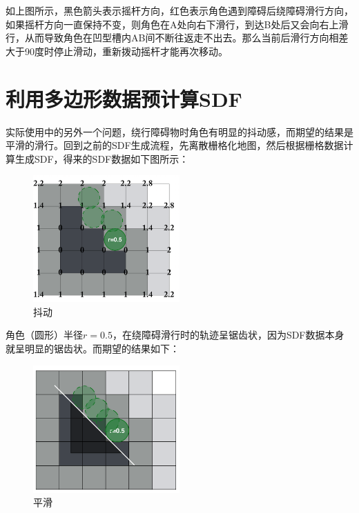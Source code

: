 如上图所示，黑色箭头表示摇杆方向，红色表示角色遇到障碍后绕障碍滑行方向，如果摇杆方向一直保持不变，则角色在A处向右下滑行，到达B处后又会向右上滑行，从而导致角色在凹型槽内AB间不断往返走不出去。那么当前后滑行方向相差大于90度时停止滑动，重新拨动摇杆才能再次移动。

\hypertarget{ux5229ux7528ux591aux8fb9ux5f62ux6570ux636eux9884ux8ba1ux7b97sdf}{%
\section{利用多边形数据预计算SDF}\label{ux5229ux7528ux591aux8fb9ux5f62ux6570ux636eux9884ux8ba1ux7b97sdf}}

实际使用中的另外一个问题，绕行障碍物时角色有明显的抖动感，而期望的结果是平滑的滑行。回到之前的SDF生成流程，先离散栅格化地图，然后根据栅格数据计算生成SDF，得来的SDF数据如下图所示：

\begin{figure}
\centering
\includegraphics[width=0.5\textwidth,height=\textheight]{抖动.png}
\caption{抖动}
\end{figure}

角色（圆形）半径\(r = 0.5\)，在绕障碍滑行时的轨迹呈锯齿状，因为SDF数据本身就呈明显的锯齿状。而期望的结果如下：

\begin{figure}
\centering
\includegraphics[width=0.5\textwidth,height=\textheight]{平滑.png}
\caption{平滑}
\end{figure}

